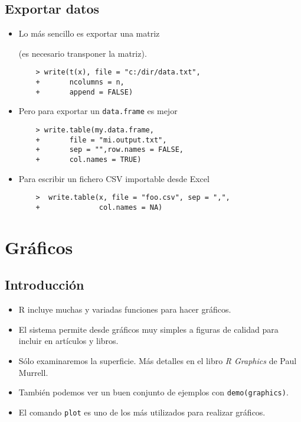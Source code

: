 \newslide

\subsection{Exportar datos}

\begin{itemize}
    \item Lo más sencillo es exportar una matriz

    (es necesario transponer la matriz).
    \begin{verbatim}
    > write(t(x), file = "c:/dir/data.txt",
    +       ncolumns = n,
    +       append = FALSE)
    \end{verbatim}

    \item Pero para exportar un \verb"data.frame" es mejor
    \begin{verbatim}
    > write.table(my.data.frame,
    +       file = "mi.output.txt",
    +       sep = "",row.names = FALSE,
    +       col.names = TRUE)
    \end{verbatim}
    \item  Para escribir un fichero CSV importable desde Excel
    \begin{verbatim}
    >  write.table(x, file = "foo.csv", sep = ",",
    +              col.names = NA)
    \end{verbatim}
\end{itemize}




\section{Gráficos}

\subsection{Introducción}

\begin{itemize}
\item R incluye muchas y variadas funciones para hacer gráficos.
\item El sistema permite desde gráficos muy simples a figuras de
calidad para incluir en artículos y libros.
\item Sólo examinaremos la superficie. Más detalles en el libro \emph{R Graphics} de Paul Murrell.
\item También podemos ver un buen conjunto de ejemplos con \verb"demo(graphics)".
\item El comando \verb"plot" es uno de los más utilizados para realizar gráficos.
\end{itemize}

